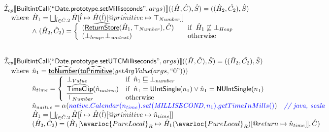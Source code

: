 \[\begin{array}{l}
\aI _{cp}\lbr \SF{BuiltintCall}(``\SF{Date.prototype.setMilliseconds}",args_{})\rbr((\hat{H},\hat{C}), \hat{S})
  = ((\hat{H}_2, \hat{C_2}), \hat{S})\\
\quad\wherec{
  \hat{H}_1 = \bigsqcup_{\hat{l} \in \hat{C}.2} \hat{H}[\hat{l}
    \mapsto \hat{H}(\hat{l})[\avarprop{primitive} \mapsto \top_{Number}]]\\
  \land\ (\hat{H}_2, \hat{C}_2) = 
    \left\{\begin{array}{l@{\quad\quad}l}
      (\ahf{ReturnStore}(\hat{H}_1, \top_{Number}), \hat{C})
      & \ifc{\hat{H}_1 \not\sqsubseteq \bot_{Heap}}\\
      (\bot_{heap}, \bot_{context}) & \owc \\
    \end{array}\right.\\
  }\\
\\\\

\aI _{cp}\lbr \SF{BuiltintCall}(``\SF{Date.prototype.setUTCMilliseconds}",args_{})\rbr((\hat{H},\hat{C}), \hat{S})
  = ((\hat{H}_2, \hat{C_2}), \hat{S})\\
\quad\wherec{
  \hat{n}_{1} = \ahf{toNumber}(\ahf{toPrimitive}(\hf{getArgValue}(args, ``0")))\\
  \hat{n}_{time} = \left\{\begin{array}{ll}
      \bot_{Value} & \ifc{\hat{n}_{1} \sqsubseteq  \bot_{number}}\\
      \ahf{TimeClip}(\hat{n}_{native})
      & \ifc{\hat{n}_{1} = \SF{UIntSingle}(n_{1}) \lor \hat{n}_{1} = \SF{NUIntSingle}(n_{1}) }\\
      \top_{Number} & \owc
    \end{array}\right.\\
  \hat{n}_{naitve} = \alpha({\inblue native.Calendar(n_{time}).set(\emph{MILLISECOND}, n_{1}).getTimeInMills()})
    \quad\comment{{\inblue // java, scala}}\\  
  \hat{H}_1 = \bigsqcup_{\hat{l} \in \hat{C}.2} \hat{H}[\hat{l}
    \mapsto \hat{H}(\hat{l})[\avarprop{primitive} \mapsto \hat{n}_{time}]]\\
  (\hat{H}_2, \hat{C}_2) = 
    (\hat{H}_1[\avarloc{PureLocal}_R \mapsto \hat{H}_1(\avarloc{PureLocal}_R)
      [\varprop{return} \mapsto \hat{n}_{time}]], \hat{C})\\
  }\\
\\\\
\end{array}
\]




